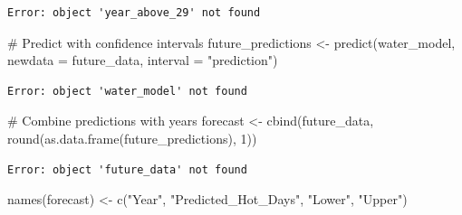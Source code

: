 \documentclass[
  letterpaper,
  DIV=11,
  numbers=noendperiod]{scrreprt}
\newenvironment{Shaded}{\begin{snugshade}}{\end{snugshade}}
\newcommand{\AttributeTok}[1]{\textcolor[rgb]{0.40,0.45,0.13}{#1}}
\newcommand{\CommentTok}[1]{\textcolor[rgb]{0.37,0.37,0.37}{#1}}
\newcommand{\DecValTok}[1]{\textcolor[rgb]{0.68,0.00,0.00}{#1}}
\newcommand{\FunctionTok}[1]{\textcolor[rgb]{0.28,0.35,0.67}{#1}}
\newcommand{\NormalTok}[1]{\textcolor[rgb]{0.00,0.23,0.31}{#1}}
\newcommand{\OtherTok}[1]{\textcolor[rgb]{0.00,0.23,0.31}{#1}}
\newcommand{\SpecialCharTok}[1]{\textcolor[rgb]{0.37,0.37,0.37}{#1}}
\newcommand{\StringTok}[1]{\textcolor[rgb]{0.13,0.47,0.30}{#1}}
\begin{document}
\begin{Shaded}
\end{Shaded}

\begin{verbatim}
Error: object 'year_above_29' not found
\end{verbatim}

\begin{Shaded}
\begin{Highlighting}[]
\CommentTok{\# Predict with confidence intervals}
\NormalTok{future\_predictions }\OtherTok{\textless{}{-}} \FunctionTok{predict}\NormalTok{(water\_model, }\AttributeTok{newdata =}\NormalTok{ future\_data, }\AttributeTok{interval =} \StringTok{"prediction"}\NormalTok{)}
\end{Highlighting}
\end{Shaded}

\begin{verbatim}
Error: object 'water_model' not found
\end{verbatim}

\begin{Shaded}
\begin{Highlighting}[]
\CommentTok{\# Combine predictions with years}
\NormalTok{forecast }\OtherTok{\textless{}{-}} \FunctionTok{cbind}\NormalTok{(future\_data, }\FunctionTok{round}\NormalTok{(}\FunctionTok{as.data.frame}\NormalTok{(future\_predictions), }\DecValTok{1}\NormalTok{))}
\end{Highlighting}
\end{Shaded}

\begin{verbatim}
Error: object 'future_data' not found
\end{verbatim}

\begin{Shaded}
\begin{Highlighting}[]
\FunctionTok{names}\NormalTok{(forecast) }\OtherTok{\textless{}{-}} \FunctionTok{c}\NormalTok{(}\StringTok{"Year"}\NormalTok{, }\StringTok{"Predicted\_Hot\_Days"}\NormalTok{, }\StringTok{"Lower"}\NormalTok{, }\StringTok{"Upper"}\NormalTok{)}
\end{Highlighting}
\end{Shaded}
\end{document}
